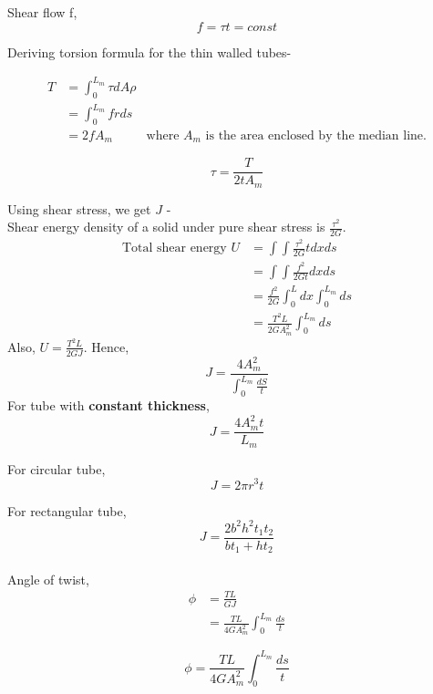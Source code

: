 \documentclass{article}
\begin{document}
		Shear flow f,
		\[\boxed{f = \tau t = const}\]

	Deriving torsion formula for the thin walled tubes- 

	\begin{align*}
		T &= \int_0^{L_m} \tau dA \rho\\
		  &= \int_0^{L_m} frds\\
		  &= 2 f A_m 	& \text{where $A_m$ is the area enclosed by the median line.}
	\end{align*}

	\[\boxed{\tau= \frac{T}{2tA_m}}\]

	Using shear stress, we get $J$ -\\
	Shear energy density of a solid under pure shear stress is $\frac{\tau^2}{2G}$. 
	\begin{align*}
		\text{Total shear energy }U &= \int\int \frac{\tau^2}{2G} t dx ds\\
								   &= \int \int \frac{f^2}{2Gt} dx ds\\
								   &= \frac{f^2}{2G} \int_0^L dx \int_0^{L_m} ds\\
								   &= \frac{T^2 L}{2G A_m^2} \int_0^{L_m} ds
	\end{align*}
	Also, $U = \frac{T^2 L}{2G J}$.
	Hence, 
		\[\boxed{J = \frac{4A_m^2}{\int_0^{L_m}\frac{dS}{t}}}\]
	For tube with \textbf{constant thickness},
		\[\boxed{J = \frac{4A_m^2t}{L_m}}\]

	For circular tube,
		\[J= 2\pi r^3 t\]

	For rectangular tube, 
		\[J = \frac{2b^2 h^2 t_1 t_2}{bt_1 + ht_2}\]\\

	Angle of twist,
	\begin{align*}
		\phi &= \frac{TL}{GJ}\\
			 &= \frac{TL}{4GA_m^2}\int_0^{L_m} \frac{ds}{t}
	\end{align*}

	\[\boxed{\phi = \frac{TL}{4GA_m^2}\int_0^{L_m} \frac{ds}{t}}\]











\end{document}
